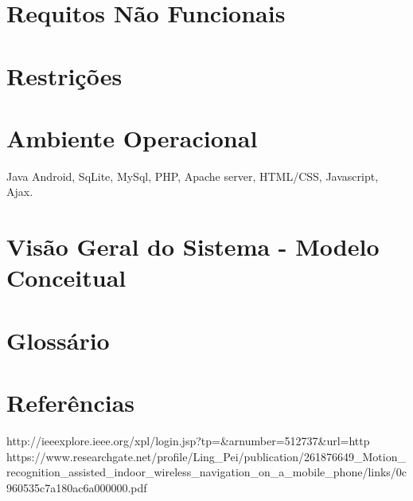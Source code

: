 \documentclass[12pt]{article}
\begin{document}
\section*{Requitos Não Funcionais}
\section*{Restrições}
\section*{Ambiente Operacional}
Java Android, SqLite, MySql, PHP, Apache server, HTML/CSS, Javascript, Ajax.
\section*{Visão Geral do Sistema - Modelo Conceitual}
\section*{Glossário}

\section*{Referências}

{   \small
	}

  http://ieeexplore.ieee.org/xpl/login.jsp?tp=&arnumber=512737&url=http%
	https://www.researchgate.net/profile/Ling_Pei/publication/261876649_Motion_recognition_assisted_indoor_wireless_navigation_on_a_mobile_phone/links/0c960535c7a180ac6a000000.pdf	
\end{document}
